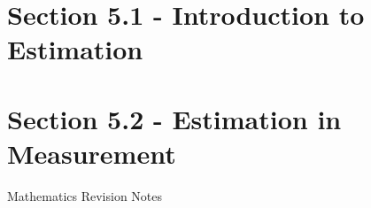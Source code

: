\documentclass[12pt, a4paper]{article}
\begin{document}
\section*{Section 5.1 - Introduction to Estimation}\label{section:1-5-1}





\section*{Section 5.2 - Estimation in Measurement}\label{section:1-5-2}

\newpage
\newpage
\thispagestyle{empty}
\begin{center}
Mathematics Revision Notes\\\vspace{1cm}
\\\vspace{1cm}
{\fontsize{24pt}{24pt}\selectfont {Introduction to Geometry}} \\\vspace{1cm}
\label{chapter:S1-6}

\end{center}
\vspace{0.5cm}
\hline
\end{document}
